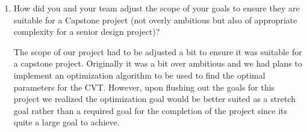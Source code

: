 \documentclass{article}
\begin{document}
\begin{enumerate}
    \item How did you and your team adjust the scope of your goals to ensure
    they are suitable for a Capstone project (not overly ambitious but also of
    appropriate complexity for a senior design project)?

    The scope of our project had to be adjusted a bit to ensure it was suitable
    for a capstone project. Originally it was a bit over ambitious and we
    had plans to implement an optimization algorithm to be used to find the
    optimal parameters for the CVT. However, upon flushing out the goals for
    this project we realized the optimization goal would be better suited as a
    stretch goal rather than a required goal for the completion of the project
    since its quite a large goal to achieve.
    \end{enumerate}  
\end{document}
